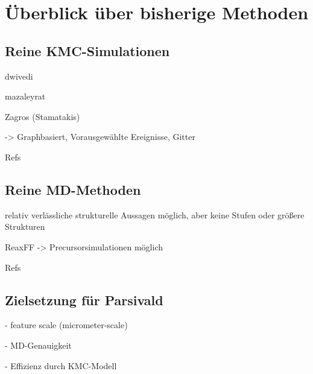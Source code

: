 \section{Überblick über bisherige Methoden}

\subsection{Reine KMC-Simulationen}

dwivedi

mazaleyrat

Zagros (Stamatakis)

-> Graphbasiert, Vorausgewählte Ereignisse, Gitter

Refs


\subsection{Reine MD-Methoden}

relativ verlässliche strukturelle Aussagen möglich, aber keine Stufen oder größere Strukturen

ReaxFF -> Precursorsimulationen möglich

Refs


\subsection{Zielsetzung für Parsivald}

- feature scale (micrometer-scale)

- MD-Genauigkeit

- Effizienz durch KMC-Modell
